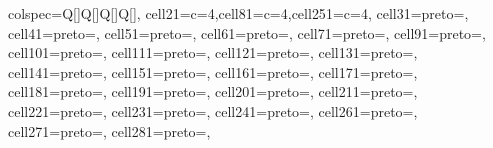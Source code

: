 \documentclass[
  man,
  longtable,
  nolmodern,
  notxfonts,
  notimes,
  colorlinks=true,linkcolor=blue,citecolor=blue,urlcolor=blue]{apa7}
\begin{document}
\begin{table}

{\caption{{List of items with unexpectedly high accuracy: the
Levenshtein similarity score between the presented word (in Catalan or
Spanish) and their correct English translation is zero, but
participants, who are reportedly unfamiliar with the presented language,
were on average \textgreater10\% likely to guess the correct
translation.}{\label{tbl-surprises}}}
\vspace{-20pt}}

\centering
\begin{tblr}[         %
]                     %
{                     %
colspec={Q[]Q[]Q[]Q[]},
cell{2}{1}={c=4}{},cell{8}{1}={c=4}{},cell{25}{1}={c=4}{},
cell{3}{1}={preto={\hspace{1em}}},
cell{4}{1}={preto={\hspace{1em}}},
cell{5}{1}={preto={\hspace{1em}}},
cell{6}{1}={preto={\hspace{1em}}},
cell{7}{1}={preto={\hspace{1em}}},
cell{9}{1}={preto={\hspace{1em}}},
cell{10}{1}={preto={\hspace{1em}}},
cell{11}{1}={preto={\hspace{1em}}},
cell{12}{1}={preto={\hspace{1em}}},
cell{13}{1}={preto={\hspace{1em}}},
cell{14}{1}={preto={\hspace{1em}}},
cell{15}{1}={preto={\hspace{1em}}},
cell{16}{1}={preto={\hspace{1em}}},
cell{17}{1}={preto={\hspace{1em}}},
cell{18}{1}={preto={\hspace{1em}}},
cell{19}{1}={preto={\hspace{1em}}},
cell{20}{1}={preto={\hspace{1em}}},
cell{21}{1}={preto={\hspace{1em}}},
cell{22}{1}={preto={\hspace{1em}}},
cell{23}{1}={preto={\hspace{1em}}},
cell{24}{1}={preto={\hspace{1em}}},
cell{26}{1}={preto={\hspace{1em}}},
cell{27}{1}={preto={\hspace{1em}}},
cell{28}{1}={preto={\hspace{1em}}},
}
\end{tblr}
\end{table}
\end{document}
